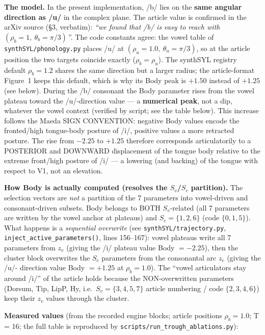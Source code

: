 \documentclass[11pt,a4paper]{article}
\begin{document}
\textbf{The model.} In the present implementation, /b/ lies on the
\textbf{same angular direction as /u/} in the complex plane. The
article value is confirmed in the arXiv source (\S3, verbatim):
\textit{``we found that /b/ is easy to reach with
$(\rho_b = 1,\ \theta_b = \pi/3)$''}. The code constants agree: the
vowel table of \texttt{synthSYL/phonology.py} places /u/ at
$(\rho_u = 1.0,\ \theta_u = \pi/3)$, so at the article position the
two targets coincide exactly ($\rho_b = \rho_u$). The synthSYL
registry default $\rho_b = 1.2$ shares the same direction but a
larger radius; the article-format Figure~1 keeps this default, which
is why its Body peak is
$+1.50$ instead of $+1.25$ (see below).
During the /b/ consonant the Body parameter rises from the vowel
plateau toward the /u/-direction value --- a \textbf{numerical peak},
not a dip, whatever the vowel context (verified by script; see the
table below). This increase follows the Maeda SIGN CONVENTION:
negative Body values encode the fronted/high tongue-body posture of
/i/, positive values a more retracted posture. The rise from $-2.25$
to $+1.25$ therefore corresponds articulatorily to a POSTERIOR and
DOWNWARD displacement of the tongue body relative to the extreme
front/high posture of /i/ --- a lowering (and backing) of the tongue
with respect to V1, not an elevation.

\textbf{How Body is actually computed (resolves the $S_v$/$S_c$
partition).} The selection vectors are \emph{not} a partition of the
7 parameters into vowel-driven and consonant-driven subsets. Body
belongs to BOTH $S_v$-related (all 7 parameters are written by the
vowel anchor at plateaus) and $S_c = \{1,2,6\}$ (code $\{0,1,5\}$).
What happens is a \emph{sequential overwrite}
(see \texttt{synthSYL/trajectory.py}, \texttt{inject\_active\_parameters()}, lines 156--167):
vowel plateaus write all 7 parameters from $z_v$ (giving the /i/
plateau value Body $= -2.25$), then the cluster block overwrites the
$S_c$ parameters from the consonantal arc $z_c$ (giving the /u/-
direction value Body $= +1.25$ at $\rho_b = 1.0$). The ``vowel
articulators stay around /i/'' of the article holds because the
NON-overwritten parameters (Dorsum, Tip, LipP, Hy, i.e.\
$S_v = \{3,4,5,7\}$ article numbering / code $\{2,3,4,6\}$) keep
their $z_v$ values through the cluster.

\textbf{Measured values} (from the recorded engine blocks; article
positions $\rho_b = 1.0$; T = 16; the full table is reproduced by
\texttt{scripts/run\_trough\_ablations.py}):
\end{document}
